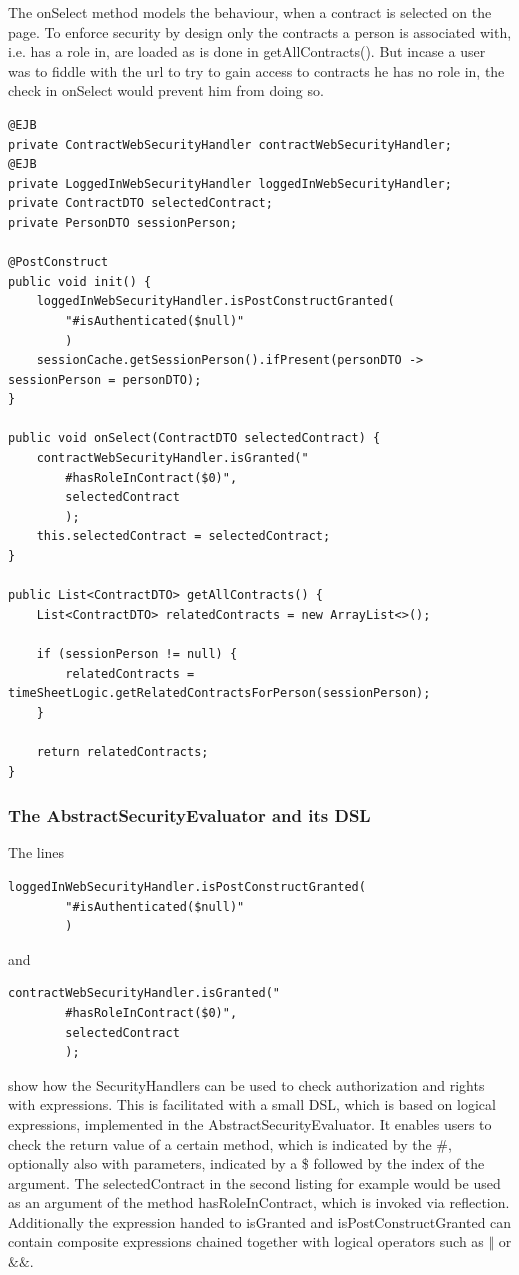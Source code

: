 \documentclass{article}
\begin{document}
The onSelect method models the behaviour, when a contract is selected on the page. To enforce security by design only the contracts a person is associated with, i.e. has a role in, are loaded as is done in getAllContracts(). But incase a user was to fiddle with the url to try to gain access to contracts he has no role in, the check in onSelect would prevent him from doing so. 
\begin{lstlisting}
@EJB
private ContractWebSecurityHandler contractWebSecurityHandler;
@EJB
private LoggedInWebSecurityHandler loggedInWebSecurityHandler;
private ContractDTO selectedContract;
private PersonDTO sessionPerson;

@PostConstruct
public void init() {
	loggedInWebSecurityHandler.isPostConstructGranted(
		"#isAuthenticated($null)"
		)
    sessionCache.getSessionPerson().ifPresent(personDTO -> sessionPerson = personDTO);
}

public void onSelect(ContractDTO selectedContract) {
	contractWebSecurityHandler.isGranted("
		#hasRoleInContract($0)",
		selectedContract
		);
    this.selectedContract = selectedContract;
}

public List<ContractDTO> getAllContracts() {
	List<ContractDTO> relatedContracts = new ArrayList<>();

    if (sessionPerson != null) {
    	relatedContracts = timeSheetLogic.getRelatedContractsForPerson(sessionPerson);
    }
    
	return relatedContracts;
}

\end{lstlisting}
\newpage

\subsubsection{The AbstractSecurityEvaluator and its DSL}

The lines \begin{lstlisting}
loggedInWebSecurityHandler.isPostConstructGranted(
		"#isAuthenticated($null)"
		)
\end{lstlisting}
and 
\begin{lstlisting}
contractWebSecurityHandler.isGranted("
		#hasRoleInContract($0)",
		selectedContract
		);
\end{lstlisting}
show how the SecurityHandlers can be used to check authorization and rights with expressions. This is facilitated with a small DSL, which is based on logical expressions, implemented in the AbstractSecurityEvaluator. It enables users to check the return value of a certain method, which is indicated by the \#, optionally also with parameters, indicated by a \$ followed by the index of the argument. The selectedContract in the second listing for example would be used as an argument of the method hasRoleInContract, which is invoked via reflection. Additionally the expression handed to isGranted and isPostConstructGranted can contain composite expressions chained together with logical operators such as $\Vert$ or $\&\&$.
\newpage
\end{document}
